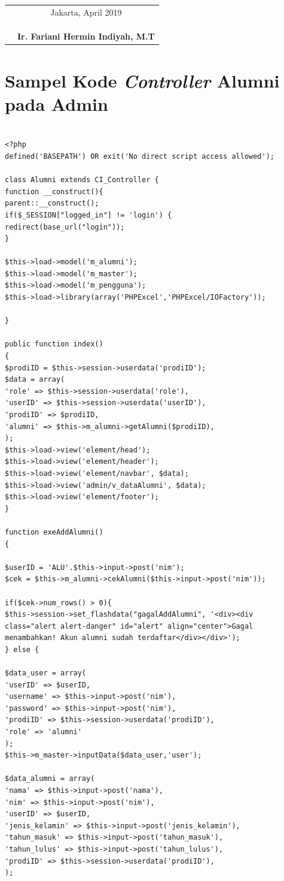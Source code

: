 \begin{tabular}{p{7.5cm}c}
	&Jakarta, April 2019\\
	&\\
	&\\
	&\\
	&\textbf{Ir. Fariani Hermin Indiyah, M.T}
\end{tabular}

\chapter{Sampel Kode \textit{Controller} Alumni pada Admin}

\begin{verbatim}

<?php
defined('BASEPATH') OR exit('No direct script access allowed');

class Alumni extends CI_Controller {
function __construct(){
parent::__construct();
if($_SESSION["logged_in"] != 'login') {
redirect(base_url("login"));
}

$this->load->model('m_alumni');
$this->load->model('m_master');
$this->load->model('m_pengguna');
$this->load->library(array('PHPExcel','PHPExcel/IOFactory'));

}

public function index()
{
$prodiID = $this->session->userdata('prodiID');
$data = array(
'role' => $this->session->userdata('role'),
'userID' => $this->session->userdata('userID'),
'prodiID' => $prodiID,
'alumni' => $this->m_alumni->getAlumni($prodiID),
);
$this->load->view('element/head');
$this->load->view('element/header');
$this->load->view('element/navbar', $data);
$this->load->view('admin/v_dataAlumni', $data);
$this->load->view('element/footer');
}

function exeAddAlumni()
{

$userID = 'ALU'.$this->input->post('nim');
$cek = $this->m_alumni->cekAlumni($this->input->post('nim'));

if($cek->num_rows() > 0){
$this->session->set_flashdata("gagalAddAlumni", '<div><div class="alert alert-danger" id="alert" align="center">Gagal menambahkan! Akun alumni sudah terdaftar</div></div>');
} else {

$data_user = array(
'userID' => $userID,
'username' => $this->input->post('nim'),
'password' => $this->input->post('nim'),
'prodiID' => $this->session->userdata('prodiID'),
'role' => 'alumni'
);
$this->m_master->inputData($data_user,'user');

$data_alumni = array(
'nama' => $this->input->post('nama'),
'nim' => $this->input->post('nim'),
'userID' => $userID,
'jenis_kelamin' => $this->input->post('jenis_kelamin'),
'tahun_masuk' => $this->input->post('tahun_masuk'),
'tahun_lulus' => $this->input->post('tahun_lulus'),
'prodiID' => $this->session->userdata('prodiID'),
);


\end{verbatim}

